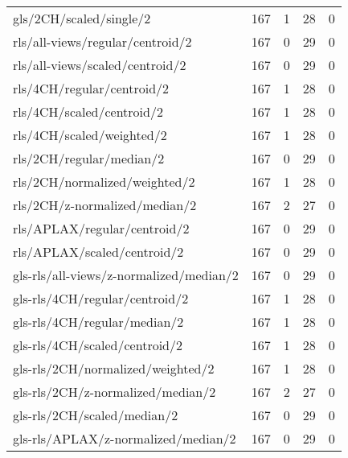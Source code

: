 \begin{longtable}{lrrrr}
    gls/2CH/scaled/single/2                   & 167 &  1 & 28 &  0 \\
    rls/all-views/regular/centroid/2          & 167 &  0 & 29 &  0 \\
    rls/all-views/scaled/centroid/2           & 167 &  0 & 29 &  0 \\
    rls/4CH/regular/centroid/2                & 167 &  1 & 28 &  0 \\
    rls/4CH/scaled/centroid/2                 & 167 &  1 & 28 &  0 \\
    rls/4CH/scaled/weighted/2                 & 167 &  1 & 28 &  0 \\
    rls/2CH/regular/median/2                  & 167 &  0 & 29 &  0 \\
    rls/2CH/normalized/weighted/2             & 167 &  1 & 28 &  0 \\
    rls/2CH/z-normalized/median/2             & 167 &  2 & 27 &  0 \\
    rls/APLAX/regular/centroid/2              & 167 &  0 & 29 &  0 \\
    rls/APLAX/scaled/centroid/2               & 167 &  0 & 29 &  0 \\
    gls-rls/all-views/z-normalized/median/2   & 167 &  0 & 29 &  0 \\
    gls-rls/4CH/regular/centroid/2            & 167 &  1 & 28 &  0 \\
    gls-rls/4CH/regular/median/2              & 167 &  1 & 28 &  0 \\
    gls-rls/4CH/scaled/centroid/2             & 167 &  1 & 28 &  0 \\
    gls-rls/2CH/normalized/weighted/2         & 167 &  1 & 28 &  0 \\
    gls-rls/2CH/z-normalized/median/2         & 167 &  2 & 27 &  0 \\
    gls-rls/2CH/scaled/median/2               & 167 &  0 & 29 &  0 \\
    gls-rls/APLAX/z-normalized/median/2       & 167 &  0 & 29 &  0 \\
    \hline
\end{longtable}
